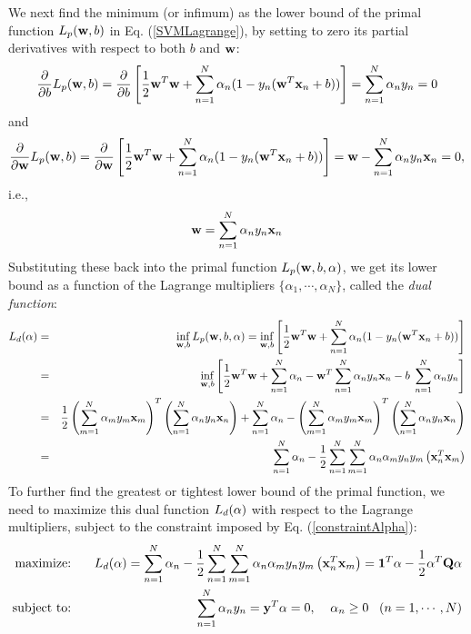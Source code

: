 \documentclass{article}
\begin{document}
We next find the minimum (or infimum) as the lower bound of the primal 
function $L_p({\bf w},b)$ in Eq. (\ref{SVMLagrange}), by setting to 
zero its partial derivatives with respect to both $b$ and ${\bf w}$:
\begin{equation}
  \frac{\partial}{\partial b}L_p({\bf w},b)
  =\frac{\partial}{\partial b}  \left[ \frac{1}{2}{\bf w}^T{\bf w}
  +\sum_{n=1}^N \alpha_n(1-y_n( {\bf w}^T {\bf x}_n+b))\right]
  =\sum_{n=1}^N \alpha_n y_n=0	
  \label{constraintAlpha}
\end{equation}
and
\begin{equation}
  \frac{\partial}{\partial {\bf w}}L_p({\bf w},b)
  =\frac{\partial}{\partial {\bf w}} 
  \left[ \frac{1}{2}{\bf w}^T{\bf w}
  +\sum_{n=1}^N \alpha_n(1-y_n( {\bf w}^T {\bf x}_n+b))\right]
  ={\bf w}-\sum_{n=1}^N\alpha_ny_n{\bf x}_n=0,
\end{equation}
i.e.,
\begin{equation}
  {\bf w}=\sum_{n=1}^N \alpha_n y_n {\bf x}_n
  \label{SVMweightvector}
\end{equation}
Substituting these back into the primal function 
$L_p({\bf w},b,{\bf\alpha})$, we get its lower bound as a function
of the Lagrange multipliers $\{\alpha_1,\cdots,\alpha_N\}$, called 
the {\em dual function}:
\begin{eqnarray}
  L_d({\bf \alpha})&=&\inf_{{\bf w},b} L_p({\bf w},b,{\bf \alpha})
    =\inf_{{\bf w},b}\left[\frac{1}{2}{\bf w}^T{\bf w}
  +\sum_{n=1}^N \alpha_n(1-y_n( {\bf w}^T {\bf x}_n+b)) \right]
  \nonumber\\
  &=&\inf_{{\bf w},b}\left[\frac{1}{2}{\bf w}^T{\bf w}
  +\sum_{n=1}^N \alpha_n -{\bf w}^T \sum_{n=1}^N \alpha_ny_n{\bf x}_n
  -b\;\sum_{n=1}^N \alpha_ny_n \right]
  \nonumber\\
  &=&\frac{1}{2} \left(\sum_{m=1}^N \alpha_m y_m {\bf x}_m\right)^T
  \left(\sum_{n=1}^N \alpha_n y_n {\bf x}_n\right)+\sum_{n=1}^N \alpha_n
  -\left(\sum_{m=1}^N \alpha_m y_m {\bf x}_m\right)^T
  \left(\sum_{n=1}^N \alpha_n y_n {\bf x}_n\right)
  \nonumber\\
  &=&\sum_{n=1}^N\alpha_n -\frac{1}{2}
  \sum_{n=1}^N \sum_{m=1}^N \alpha_n \alpha_m y_n y_m
  \left({\bf x}_n^T{\bf x}_m\right)
\end{eqnarray}
To further find the greatest or tightest lower bound of the primal 
function, we need to maximize this dual function $L_d({\bf\alpha})$ 
with respect to the Lagrange multipliers, subject to the constraint 
imposed by Eq. (\ref{constraintAlpha}):
\begin{eqnarray}
  \mbox{maximize:} \;\;\; && L_d({\bf\alpha})
  =\sum_{n=1}^N\alpha_n -\frac{1}{2}
  \sum_{n=1}^N \sum_{m=1}^N \alpha_n \alpha_m y_n y_m
  \left({\bf x}_n^T{\bf x}_m\right)
  ={\bf 1}^T{\bf\alpha}-\frac{1}{2}{\bf\alpha}^T{\bf Q}{\bf\alpha}
  \nonumber \\
  \mbox{subject to:} \;\;\; && \sum_{n=1}^N \alpha_n y_n
  ={\bf y}^T{\bf\alpha}=0, \;\;\;\; \alpha_n\ge 0\;\;\;(n=1,\cdots,N)
  \label{dualProblem}
\end{eqnarray}
\end{document}

